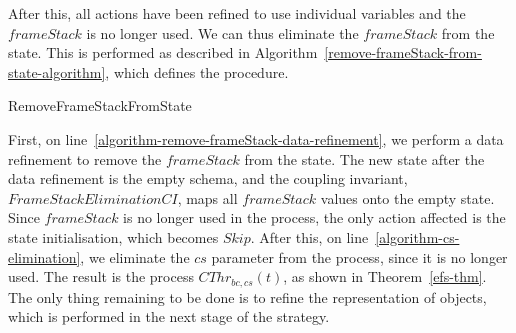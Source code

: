 After this, all actions have been refined to use individual variables
and the $frameStack$ is no longer used.
We can thus eliminate the $frameStack$ from the state. 
This is performed as described in
Algorithm~\ref{remove-frameStack-from-state-algorithm}, which defines
the  procedure.

\begin{algorithm}
  \begin{algorithmic}
    \State {}
    \label{algorithm-remove-frameStack-data-refinement}
    \State {}
    \label{algorithm-cs-elimination}
  \end{algorithmic}
  \caption{RemoveFrameStackFromState}
  \label{remove-frameStack-from-state-algorithm}
\end{algorithm}

First, on line~\ref{algorithm-remove-frameStack-data-refinement}, we
perform a data refinement to remove the $frameStack$ from the state.
The new state after the data refinement is the empty schema, and the
coupling invariant, $FrameStackEliminationCI$, maps all $frameStack$
values onto the empty state.
Since $frameStack$ is no longer used in the process, the only action
affected is the state initialisation, which becomes $Skip$.
After this, on line~\ref{algorithm-cs-elimination}, we eliminate the
$cs$ parameter from the process, since it is no longer used.
The result is the process $CThr_{bc,cs}(t)$, as shown in
Theorem~\ref{efs-thm}.
The only thing remaining to be done is to refine the representation of
objects, which is performed in the next stage of the strategy.
